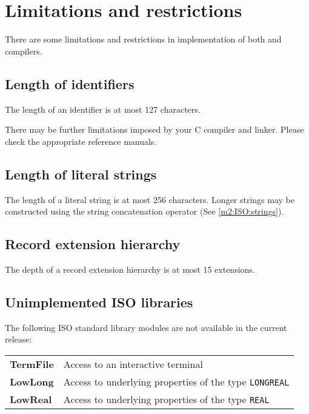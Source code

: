 \chapter{Limitations and restrictions}\label{limits}

There are some limitations and restrictions in implementation of both
\mt{} and \ot{} compilers.

\section*{Length of identifiers}

The length of an identifier is at most 127 characters.

\ifgenc
There may be further limitations imposed by your C compiler and linker.
Please check the appropriate reference manuals.
\fi %

\section*{Length of literal strings}

The  length of a literal string is at most 256 characters. Longer
strings  may  be  constructed  using the string concatenation
operator (See \ref{m2:ISO:strings}).

\section*{Record extension hierarchy}

The depth of a record extension hierarchy is at most 15 extensions.

\section*{Unimplemented ISO libraries}

\ifgenc
The following \mt{} ISO standard library modules are not
available in the current release:
\begin{flushleft}
\begin{tabular}{ll}
\bf TermFile & Access to an interactive terminal                      \\
\bf LowLong  & Access to underlying properties of the type {\tt LONGREAL}   \\
\bf LowReal  & Access to underlying properties of the type {\tt REAL}   \\
\end{tabular}
\end{flushleft}
\fi %

